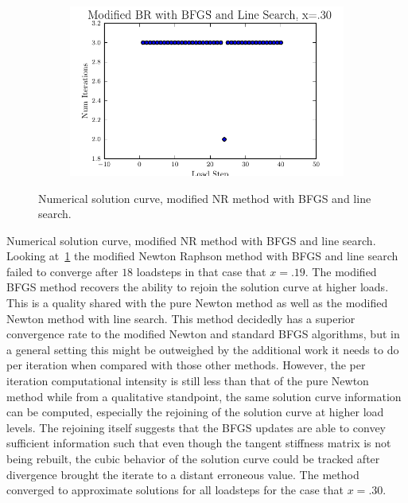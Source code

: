 \documentclass[10pt,letterpaper]{article}
\begin{document}
\begin{figure}[!tbh]
\begin{subfigure}[b]{.6\textwidth}
    \caption{}
    \label{fig6:label:c}
  \end{subfigure}
  \hfill
  \begin{subfigure}[b]{.6\textwidth}
    \includegraphics[width=\textwidth]{moded_nr_bfgs_wls_x30_conv.pdf}
    \caption{}
    \label{fig6:label:d}
  \end{subfigure}
    \caption{Numerical solution curve, modified NR method with BFGS and line search.}
\end{figure}

Numerical solution curve, modified NR method with BFGS and line search. Looking at~\ref{fig6:label:c} the modified Newton Raphson method with BFGS and line search failed to converge after $18$ loadsteps in that case that $x=.19$. The modified BFGS method recovers the ability to rejoin the solution curve at higher loads. This is a quality shared with the pure Newton method as well as the modified Newton method with line search. This method decidedly has a superior convergence rate to the modified Newton and standard BFGS algorithms, but in a general setting this might be outweighed by the additional work it needs to do per iteration when compared with those other methods. However, the per iteration computational intensity is still less than that of the pure Newton method while from a qualitative standpoint, the same solution curve information can be computed, especially the rejoining of the solution curve at higher load levels. The rejoining itself suggests that the BFGS updates are able to convey sufficient information such that even though the tangent stiffness matrix is not being rebuilt, the cubic behavior of the solution curve could be tracked after divergence brought the iterate to a distant erroneous value. The method converged to approximate solutions for all loadsteps for the case that $x=.30$.
\end{document}
